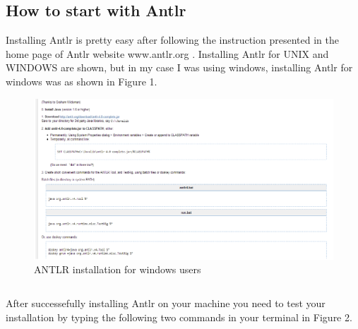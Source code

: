\documentclass[a4paper]{article}
\begin{document}
\subsection{How to start with Antlr}
Installing Antlr is pretty easy after following the instruction presented in the home page of Antlr website www.antlr.org .
\newpage
Installing Antlr for UNIX and WINDOWS are shown, but in my case I was using windows, installing Antlr for windows was as shown in Figure 1.
$$ $$
\begin{figure}[ht]
\includegraphics[width = \paperwidth]{1.png} 
\caption{ANTLR installation for windows users}
\end{figure}

$$ $$
\newpage

After successefully installing Antlr on your machine you need to test your installation by typing the following two commands in your terminal in Figure 2. 
\end{document}

